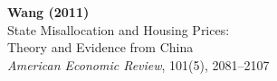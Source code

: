 \documentclass[12pt]{article}
\begin{document}
\begin{center}
{\Large\bfseries Wang (2011)}\\
{\large State Misallocation and Housing Prices:}\\
{\large Theory and Evidence from China}\\
\vspace{0.5em}
{\normalsize \textit{American Economic Review},
 101(5), 2081--2107}
\end{center}

\vspace{1em}



\clearpage

\end{document}
